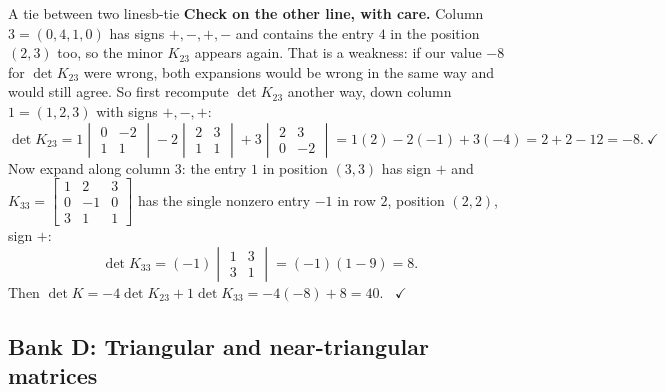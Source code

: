 \documentclass[11pt]{article}
\begin{document}
\begin{exmp}{A tie between two lines}{b-tie}
\textbf{Check on the other line, with care.} Column $3=(0,4,1,0)$ has signs $+,-,+,-$ and contains the entry $4$ in the position $(2,3)$ too, so the minor $K_{23}$ appears again. That is a weakness: if our value $-8$ for $\det K_{23}$ were wrong, both expansions would be wrong in the same way and would still agree. So first recompute $\det K_{23}$ another way, down column $1=(1,2,3)$ with signs $+,-,+$:
\[
\det K_{23}=1\begin{vmatrix}0&-2\\1&1\end{vmatrix}-2\begin{vmatrix}2&3\\1&1\end{vmatrix}+3\begin{vmatrix}2&3\\0&-2\end{vmatrix}=1(2)-2(-1)+3(-4)=2+2-12=-8.\ \checkmark
\]
Now expand along column $3$: the entry $1$ in position $(3,3)$ has sign $+$ and $K_{33}=\begin{bmatrix}1&2&3\\0&-1&0\\3&1&1\end{bmatrix}$ has the single nonzero entry $-1$ in row $2$, position $(2,2)$, sign $+$:
\[
\det K_{33}=(-1)\begin{vmatrix}1&3\\3&1\end{vmatrix}=(-1)(1-9)=8.
\]
Then $\det K=-4\det K_{23}+1\det K_{33}=-4(-8)+8=40$. \ $\checkmark$
\end{exmp}

\subsection*{Bank D: Triangular and near-triangular matrices}
\end{document}
